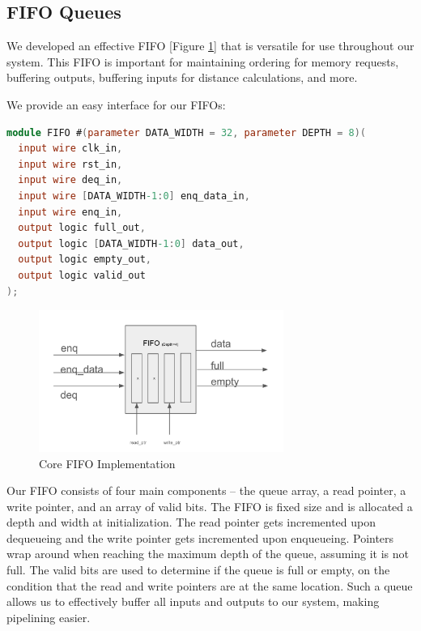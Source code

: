 \documentclass[conference]{IEEEtran}
\begin{document}


\subsection{FIFO Queues}

We developed an effective FIFO [Figure \ref{fifofig}] that is versatile for use throughout our system. This FIFO is important for maintaining ordering for memory requests, buffering outputs, buffering inputs for distance calculations, and more. 

We provide an easy interface for our FIFOs:
\begin{lstlisting}[language=Verilog]
module FIFO #(parameter DATA_WIDTH = 32, parameter DEPTH = 8)(
  input wire clk_in,
  input wire rst_in,
  input wire deq_in,
  input wire [DATA_WIDTH-1:0] enq_data_in,
  input wire enq_in,
  output logic full_out,
  output logic [DATA_WIDTH-1:0] data_out,
  output logic empty_out,
  output logic valid_out
);
\end{lstlisting}

\begin{figure}[htbp]
\centerline{\includegraphics[width=8cm]{fifo.png}}
\caption{Core FIFO Implementation}
\label{fifofig}
\end{figure}
Our FIFO consists of four main components -- the queue array, a read pointer, a write pointer, and an array of valid bits. The FIFO is fixed size and is allocated a depth and width at initialization. The read pointer gets incremented upon dequeueing and the write pointer gets incremented upon enqueueing. Pointers wrap around when reaching the maximum depth of the queue, assuming it is not full. The valid bits are used to determine if the queue is full or empty, on the condition that the read and write pointers are at the same location. Such a queue allows us to effectively buffer all inputs and outputs to our system, making pipelining easier.
\end{document}
